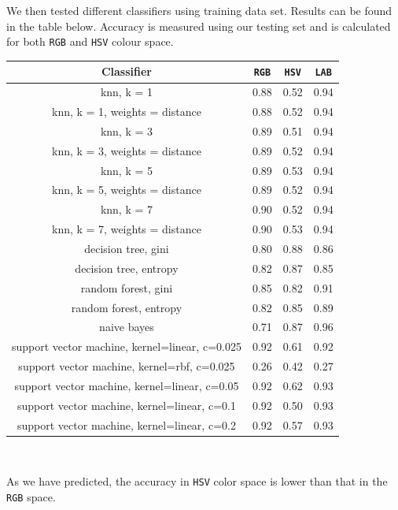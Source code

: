 \documentclass[12pt,a4paper]{article}
\begin{document}
	We then tested different classifiers using training data set. Results can be found in the table below. Accuracy is measured using our testing set and is calculated for both \texttt{RGB} and \texttt{HSV} colour space.
	
	\begin{center}
		\begin{tabular}{|c|c|c|c|}
			\hline 
			\textbf{Classifier} & \texttt{RGB} & \texttt{HSV} & \texttt{LAB} \\
			\hline
			knn, k = 1 & 0.88 & 0.52 & 0.94 \\ \hline
			knn, k = 1, weights = distance & 0.88 & 0.52 & 0.94 \\ \hline
			knn, k = 3 & 0.89 & 0.51 & 0.94 \\ \hline
			knn, k = 3, weights = distance & 0.89 & 0.52 & 0.94 \\ \hline
			knn, k = 5 & 0.89 & 0.53 & 0.94 \\ \hline
			knn, k = 5, weights = distance & 0.89 & 0.52 & 0.94 \\ \hline
			knn, k = 7 & 0.90 & 0.52 & 0.94 \\ \hline
			knn, k = 7, weights = distance & 0.90 & 0.53 & 0.94 \\ \hline
			decision tree, gini & 0.80 & 0.88 & 0.86 \\ \hline
			decision tree, entropy & 0.82 & 0.87 & 0.85 \\ \hline
			random forest, gini & 0.85 & 0.82 & 0.91 \\ \hline
			random forest, entropy & 0.82 & 0.85 & 0.89 \\ \hline
			naive bayes & 0.71 & 0.87 & 0.96 \\ \hline
			support vector machine, kernel=linear, c=0.025 & 0.92 & 0.61 & 0.92 \\ \hline
			support vector machine, kernel=rbf, c=0.025 & 0.26 & 0.42 & 0.27 \\ \hline
			support vector machine, kernel=linear, c=0.05 & 0.92 & 0.62 & 0.93 \\ \hline
			support vector machine, kernel=linear, c=0.1 & 0.92 & 0.50 & 0.93 \\ \hline
			support vector machine, kernel=linear, c=0.2 & 0.92 & 0.57 & 0.93 \\ \hline
		\end{tabular} \\
	\end{center}

	As we have predicted, the accuracy in \texttt{HSV} color space is lower than that in the \texttt{RGB} space. \\
	
\end{document}
